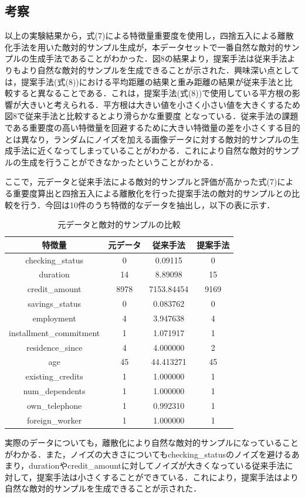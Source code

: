 \subsection{考察}
以上の実験結果から，式(7)による特徴量重要度を使用し，四捨五入による離散化手法を用いた敵対的サンプル生成が，本データセットで一番自然な敵対的サンプルの生成手法であることがわかった．図8の結果より，提案手法は従来手法よりもより自然な敵対的サンプルを生成できることが示された．興味深い点としては，提案手法(式(8))における平均距離の結果と重み距離の結果が従来手法と比較すると異なることである．これは，提案手法(式(8))で使用している平方根の影響が大きいと考えられる．平方根は大きい値を小さく小さい値を大きくするため図8で従来手法と比較するとより滑らかな重要度
となっている．従来手法の課題である重要度の高い特徴量を回避するために大きい特徴量の差を小さくする目的とは異なり，ランダムにノイズを加える画像データに対する敵対的サンプルの生成手法に近くなってしまっていることがわかる．これにより自然な敵対的サンプルの生成を行うことができなかったということがわかる．

ここで，元データと従来手法による敵対的サンプルと評価が高かった式(7)による重要度算出と四捨五入による離散化を行った提案手法の敵対的サンプルとの比較を行う．今回は10件のうち特徴的なデータを抽出し，以下の表に示す．

\begin{table}[H]
    \centering
    \caption{元データと敵対的サンプルの比較}
    \begin{tabular}{|c|c|c|c|} \hline
        特徴量 & 元データ & 従来手法 & 提案手法 \\ \hline
        checking\_status & 0 & 0.09115 & 0\\ \hline
        duration & 14 & 8.89098 & 15 \\ \hline
        credit\_amount & 8978 & 7153.84454 & 9169 \\ \hline
        savings\_status & 0 & 0.083762 & 0\\ \hline
        employment & 4 & 3.947638  & 4 \\ \hline
        installment\_commitment & 1 & 1.071917 & 1\\ \hline
        residence\_since & 4 & 4.000000 & 2 \\ \hline
        age & 45 & 44.413271 & 45 \\ \hline
        existing\_credits & 1 & 1.000000 & 1 \\ \hline
        num\_dependents & 1 & 1.000000 & 1 \\ \hline
        own\_telephone & 1 & 0.992310 & 1 \\ \hline
        foreign\_worker & 1 & 1.000000 & 1 \\ \hline
    \end{tabular}
\end{table}

実際のデータについても，離散化により自然な敵対的サンプルになっていることがわかる．また，ノイズの大きさについてもchecking\_statusのノイズを避けるあまり，durationやcredit\_amountに対してノイズが大きくなっている従来手法に対して，提案手法は小さくすることができている．これにより，提案手法はより自然な敵対的サンプルを生成できることが示された．